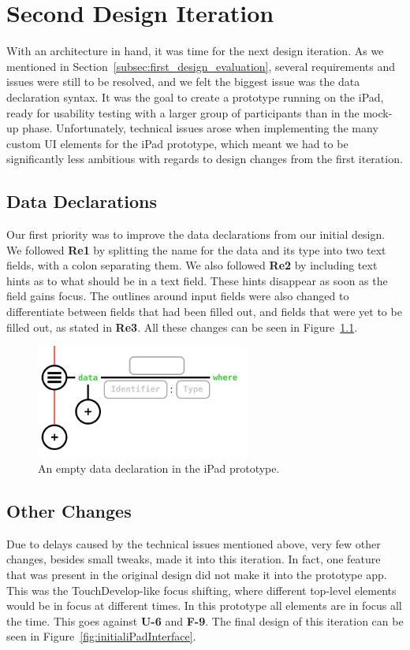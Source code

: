 \chapter{Second Design Iteration}
\label{sec:Implementation}

With an architecture in hand, it was time for the next design iteration.
As we mentioned in Section~\ref{subsec:first_design_evaluation}, several requirements and issues were still to be resolved, and we felt the biggest issue was the data declaration syntax.
It was the goal to create a prototype running on the iPad, ready for usability testing with a larger group of participants than in the mock-up phase.
Unfortunately, technical issues arose when implementing the many custom UI elements for the iPad prototype, which meant we had to be significantly less ambitious with regards to design changes from the first iteration.

\section{Data Declarations}
\label{subsec:second_data_declarations}
Our first priority was to improve the data declarations from our initial design. 
We followed \textbf{Re1} by splitting the name for the data and its type into two text fields, with a colon separating them. 
We also followed \textbf{Re2} by including text hints as to what should be in a text field.
These hints disappear as soon as the field gains focus.
The outlines around input fields were also changed to differentiate between fields that had been filled out, and fields that were yet to be filled out, as stated in \textbf{Re3}.
All these changes can be seen in Figure~\ref{fig:data_declaration}.

\begin{figure}
	\centering
		\includegraphics[width=70mm]{diagrams/data_declaration.png}
	\caption{An empty data declaration in the iPad prototype.}
\label{fig:data_declaration}
\end{figure}

\section{Other Changes}
\label{subsec:other_changes}
Due to delays caused by the technical issues mentioned above, very few other changes, besides small tweaks, made it into this iteration.
In fact, one feature that was present in the original design did not make it into the prototype app. This was the TouchDevelop-like focus shifting, where different top-level elements would be in focus at different times. In this prototype all elements are in focus all the time. This goes against \textbf{U-6} and \textbf{F-9}. 
The final design of this iteration can be seen in Figure~\ref{fig:initialiPadInterface}.

